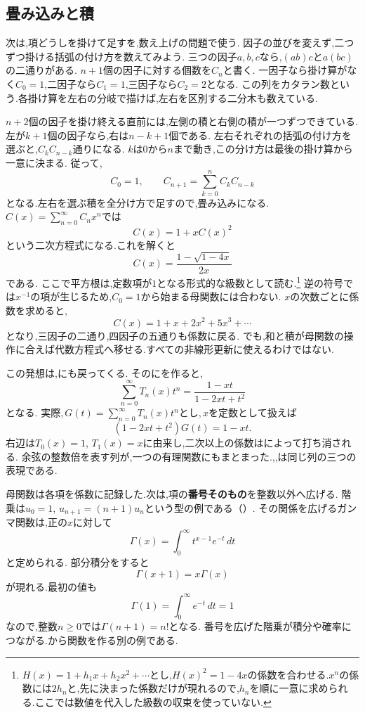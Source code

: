 \subsection{畳み込みと積}
次は,項どうしを掛けて足すを,数え上げの問題で使う.
因子の並びを変えず,二つずつ掛ける括弧の付け方を数えてみよう.
三つの因子$a,b,c$なら,$(ab)c$と$a(bc)$の二通りがある.
$n+1$個の因子に対する個数を$C_n$と書く.
一因子なら掛け算がなく$C_0=1$,二因子なら$C_1=1$,三因子なら$C_2=2$となる.
この列をカタラン数という.各掛け算を左右の分岐で描けば,左右を区別する二分木も数えている.

$n+2$個の因子を掛け終える直前には,左側の積と右側の積が一つずつできている.
左が$k+1$個の因子なら,右は$n-k+1$個である.
左右それぞれの括弧の付け方を選ぶと,$C_kC_{n-k}$通りになる.
$k$は$0$から$n$まで動き,この分け方は最後の掛け算から一意に決まる.
従って,
\[
  C_0=1,\qquad C_{n+1}=\sum_{k=0}^{n}C_kC_{n-k}
\]
となる.左右を選ぶ積を全分け方で足すので,畳み込みになる.
$C(x)=\sum_{n=0}^{\infty}C_nx^n$では
\[
  C(x)=1+xC(x)^2
\]
という二次方程式になる.これを解くと
\[
  C(x)=\frac{1-\sqrt{1-4x}}{2x}
\]
である.
ここで平方根は,定数項が$1$となる形式的な級数として読む.\footnote{$H(x)=1+h_1x+h_2x^2+\cdots$とし,$H(x)^2=1-4x$の係数を合わせる.$x^n$の係数には$2h_n$と,先に決まった係数だけが現れるので,$h_n$を順に一意に求められる.ここでは数値を代入した級数の収束を使っていない.}
逆の符号では$x^{-1}$の項が生じるため,$C_0=1$から始まる母関数には合わない.
$x$の次数ごとに係数を求めると,
\[
  C(x)=1+x+2x^2+5x^3+\cdots
\]
となり,三因子の二通り,四因子の五通りも係数に戻る.
でも,和と積が母関数の操作に合えば代数方程式へ移せる.すべての非線形更新に使えるわけではない.

この発想は,にも戻ってくる.
そのにを作ると,
\[
  \sum_{n=0}^{\infty}T_n(x)t^n
  =\frac{1-xt}{1-2xt+t^2}
\]
となる.
実際,\,$G(t)=\sum_{n=0}^\infty T_n(x)t^n$とし,\,$x$を定数として扱えば
\[
  (1-2xt+t^2)G(t)=1-xt.
\]
右辺は$T_0(x)=1$, $T_1(x)=x$に由来し,二次以上の係数はによって打ち消される.
余弦の整数倍を表す列が,一つの有理関数にもまとまった.,,は同じ列の三つの表現である.

母関数は各項を係数に記録した.次は,項の\textbf{番号そのもの}を整数以外へ広げる.
階乗は$u_0=1$, $u_{n+1}=(n+1)u_n$という型の例である（）.
その関係を広げるガンマ関数は,正の$x$に対して
\[
  \Gamma(x)=\int_0^\infty t^{x-1}e^{-t}\,dt
\]
と定められる.
部分積分をすると
\[
  \Gamma(x+1)=x\Gamma(x)
\]
が現れる.最初の値も
\[
  \Gamma(1)=\int_0^\infty e^{-t}\,dt=1
\]
なので,整数$n\ge0$では$\Gamma(n+1)=n!$となる.
番号を広げた階乗が積分や確率につながる.から関数を作る別の例である.

